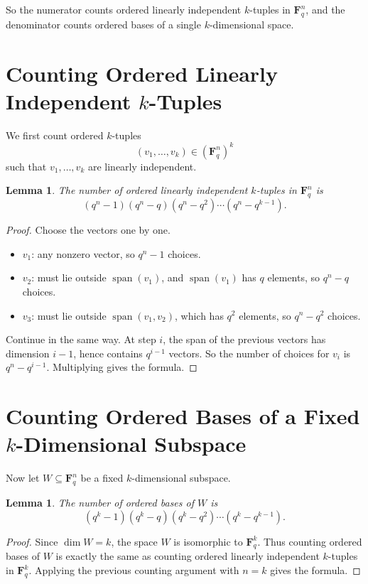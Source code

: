 \documentclass[11pt]{article}
\newtheorem{lemma}[theorem]{Lemma}
\theoremstyle{definition}
\theoremstyle{remark}
\newcommand{\F}{\mathbf{F}}
\newcommand{\Span}{\operatorname{span}}
\begin{document}
	So the numerator counts ordered linearly independent \(k\)-tuples in \(\F_q^n\), and the denominator counts ordered bases of a single \(k\)-dimensional space.
	
	\section{Counting Ordered Linearly Independent \(k\)-Tuples}
	
	We first count ordered \(k\)-tuples
	\[
	(v_1,\dots,v_k)\in (\F_q^n)^k
	\]
	such that \(v_1,\dots,v_k\) are linearly independent.
	
	\begin{lemma}
		The number of ordered linearly independent \(k\)-tuples in \(\F_q^n\) is
		\[
		(q^n-1)(q^n-q)(q^n-q^2)\cdots(q^n-q^{k-1}).
		\]
	\end{lemma}
	
	\begin{proof}
		Choose the vectors one by one.
		
		\begin{itemize}
			\item \(v_1\): any nonzero vector, so \(q^n-1\) choices.
			\item \(v_2\): must lie outside \(\Span(v_1)\), and \(\Span(v_1)\) has \(q\) elements, so \(q^n-q\) choices.
			\item \(v_3\): must lie outside \(\Span(v_1,v_2)\), which has \(q^2\) elements, so \(q^n-q^2\) choices.
		\end{itemize}
		
		Continue in the same way. At step \(i\), the span of the previous vectors has dimension \(i-1\), hence contains \(q^{i-1}\) vectors. So the number of choices for \(v_i\) is \(q^n-q^{i-1}\). Multiplying gives the formula.
	\end{proof}
	
	\section{Counting Ordered Bases of a Fixed \(k\)-Dimensional Subspace}
	
	Now let \(W\subseteq \F_q^n\) be a fixed \(k\)-dimensional subspace.
	
	\begin{lemma}
		The number of ordered bases of \(W\) is
		\[
		(q^k-1)(q^k-q)(q^k-q^2)\cdots(q^k-q^{k-1}).
		\]
	\end{lemma}
	
	\begin{proof}
		Since \(\dim W=k\), the space \(W\) is isomorphic to \(\F_q^k\). Thus counting ordered bases of \(W\) is exactly the same as counting ordered linearly independent \(k\)-tuples in \(\F_q^k\). Applying the previous counting argument with \(n=k\) gives the formula.
	\end{proof}
	
\end{document}
